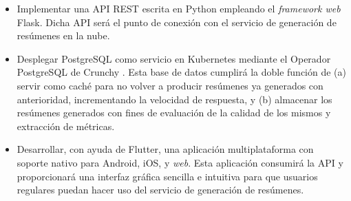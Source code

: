 \begin{itemize}
	\item [\textbullet] Implementar una API REST escrita en Python empleando el \emph{framework web} Flask. Dicha API será el punto de conexión con el servicio de generación de resúmenes en la nube.
	
	\item [\textbullet] Desplegar PostgreSQL como servicio en Kubernetes mediante el Operador PostgreSQL de Crunchy \cite{crunchy21}. Esta base de datos cumplirá la doble función de (a) servir como caché para no volver a producir resúmenes ya generados con anterioridad, incrementando la velocidad de respuesta, y (b) almacenar los resúmenes generados con fines de evaluación de la calidad de los mismos y extracción de métricas.
	
	\item [\textbullet] Desarrollar, con ayuda de Flutter, una aplicación multiplataforma con soporte nativo para Android, iOS, y \emph{web}. Esta aplicación consumirá la API y proporcionará una interfaz gráfica sencilla e intuitiva para que usuarios regulares puedan hacer uso del servicio de generación de resúmenes.
\end{itemize}